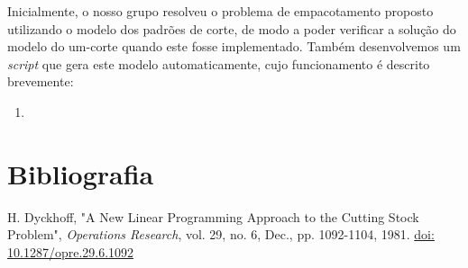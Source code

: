 \documentclass[12pt, a4paper, titlepage]{article}
\begin{document}
Inicialmente, o nosso grupo resolveu o problema de empacotamento proposto utilizando o modelo dos
padrões de corte, de modo a poder verificar a solução do modelo do um-corte quando este fosse
implementado. Também desenvolvemos um \emph{script} que gera este modelo automaticamente, cujo
funcionamento é descrito brevemente:

\begin{enumerate}
	\item %
\end{enumerate}

\section{Bibliografia}
\def\refname{}
\vspace{-1.5cm}
\begin{thebibliography}{9}
    H. Dyckhoff, "A New Linear Programming Approach to the Cutting Stock Problem",
    \emph{Operations Research}, vol. 29, no. 6, Dec., pp. 1092-1104, 1981.
    \href{https://doi.org/10.1287/opre.29.6.1092}{doi: 10.1287/opre.29.6.1092}
\end{thebibliography}
\end{document}
